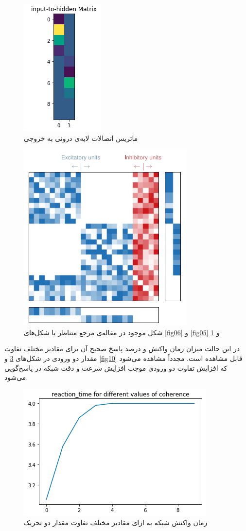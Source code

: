 \documentclass[a4paper]{article}
\begin{document}
\begin{figure}[h!]
	\centering
	\includegraphics[scale=0.7]{fig06.png}
	\caption{ماتریس اتصالات لایه‌ی درونی به خروجی}
	\label{fig07}
\end{figure}

\begin{figure}[h!]
	\centering
	\includegraphics[scale=0.7]{fig08.png}
	\caption{شکل موجود در مقاله‌ی مرجع متناظر با شکل‌های \ref{fig06} و \ref{fig05} و \ref{fig07}}
	\label{fig08}
\end{figure}
	در این حالت میزان زمان واکنش و درصد پاسخ صحیح آن برای مقادیر مختلف تفاوت مقدار دو ورودی در شکل‌های \ref{fig09} و \ref{fig10} قابل مشاهده است. مجدداً مشاهده می‌شود که افزایش تفاوت دو ورودی موجب افزایش سرعت و دقت شبکه در پاسخ‌گویی می‌شود.
\begin{figure}[h!]
	\centering
	\includegraphics[scale=0.7]{fig09.png}
	\caption{زمان واکنش شبکه به ازای مقادیر مختلف تفاوت مقدار دو تحریک}
	\label{fig09}
\end{figure}
\end{document}
